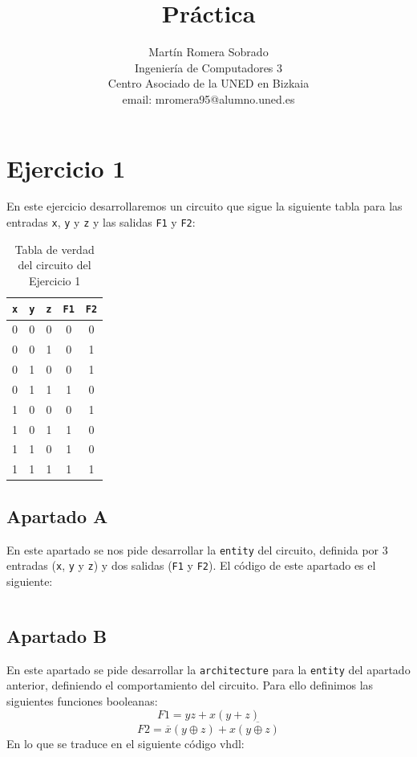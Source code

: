 \documentclass[a4paper,titlepage]{article}
\newcommand{\titulo}{Práctica}
\newcommand{\asig}{Ingeniería de Computadores 3}
\begin{document}
	
	\title{\titulo}
	\author{Martín Romera Sobrado\\
		\small{\asig} \\
		\small{Centro Asociado de la UNED en Bizkaia} \\
		\small{email: mromera95@alumno.uned.es} \\
	}
	\maketitle
	\newpage
	\section{Ejercicio 1}
		En este ejercicio desarrollaremos un circuito que sigue la siguiente tabla para las entradas \texttt{x}, \texttt{y} y \texttt{z} y las salidas 
		\texttt{F1} y \texttt{F2}:
		\begin{table}[h]
			\centering
			\begin{tabular}{|c|c|c||c|c|}
				\hline
				\texttt{x} & \texttt{y} & \texttt{z} & \texttt{F1} & \texttt{F2} \\
				\hline
				0 & 0 & 0 & 0 & 0 \\
				\hline
				0 & 0 & 1 & 0 & 1 \\
				\hline
				0 & 1 & 0 & 0 & 1 \\
				\hline
				0 & 1 & 1 & 1 & 0 \\
				\hline
				1 & 0 & 0 & 0 & 1 \\
				\hline
				1 & 0 & 1 & 1 & 0 \\
				\hline
				1 & 1 & 0 & 1 & 0 \\
				\hline
				1 & 1 & 1 & 1 & 1 \\
				\hline
			\end{tabular}
			\caption{Tabla de verdad del circuito del Ejercicio 1}
			\label{t:ej1}
		\end{table}
		\subsection{Apartado A}
			En este apartado se nos pide desarrollar la \texttt{entity} del circuito, definida por 3 entradas
			(\texttt{x}, \texttt{y} y \texttt{z}) y dos salidas (\texttt{F1} y \texttt{F2}). El código de este
			apartado es el siguiente:\\
			\inputminted[]{vhdl}{../Ejercicio1/vhdl/ej1_a.vhd}
		\subsection{Apartado B}
			En este apartado se pide desarrollar la \texttt{architecture} para la \texttt{entity} del apartado
			anterior, definiendo el comportamiento del circuito. Para ello definimos las siguientes funciones 
			booleanas:\\
			\[F1 = yz + x(y + z)\]
			\[F2 = \overline{x}(y \oplus z) + x\overline{(y \oplus z)}\]
			En lo que se traduce en el siguiente código vhdl:
			\inputminted[]{vhdl}{../Ejercicio1/vhdl/ej1_b.vhd}
\end{document}
